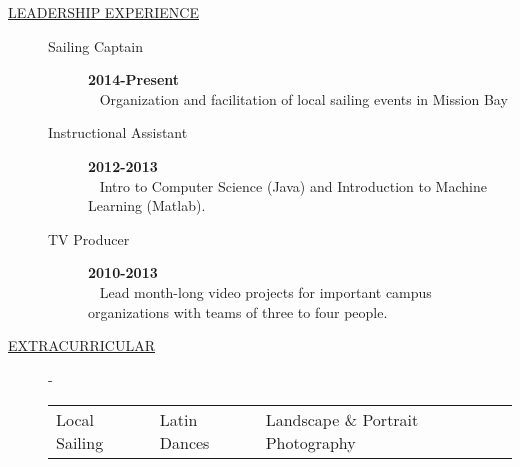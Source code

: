 \documentclass{article}
\begin{document}
\begin{description}
    \item[\underline{LEADERSHIP EXPERIENCE}] \hfill
        \vspace{-.1in}
        \begin{description} 
            \item[Sailing Captain] \hfill \textbf{2014-Present}\\
                \textbullet ~ Organization and facilitation of local sailing events in Mission Bay 
            \item[Instructional Assistant] \hfill \textbf{2012-2013}\\
                \textbullet ~ Intro to Computer Science (Java) and Introduction to Machine Learning (Matlab).
            \item[TV Producer] \hfill \textbf{2010-2013}\\
                \textbullet ~ Lead month-long video projects for important campus organizations with
                                teams of three to four people.
        \end{description}

    \vspace{-.07in}
    \item[\underline{EXTRACURRICULAR}] -
        \begin{tabular}{l|l|l}
            Local Sailing & Latin Dances & Landscape \& Portrait Photography
        \end{tabular}
	
\end{description}
\end{document}
